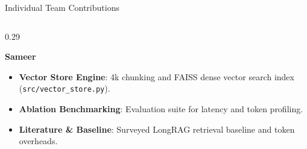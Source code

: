 \documentclass[10pt,aspectratio=169]{beamer}
\begin{document}
\begin{frame}{Individual Team Contributions}
\begin{columns}[onlytextwidth,T]
        \begin{column}{0.29\textwidth}
            \begin{block}{\textbf{Sameer}}
                \scriptsize
                \begin{itemize}\setlength\itemsep{2pt}
                    \item \textbf{Vector Store Engine}: 4k chunking and FAISS dense vector search index (\texttt{src/vector\_store.py}).
                    \item \textbf{Ablation Benchmarking}: Evaluation suite for latency and token profiling.
                    \item \textbf{Literature \& Baseline}: Surveyed LongRAG retrieval baseline and token overheads.
                \end{itemize}
            \end{block}
        \end{column}
    \end{columns}
\end{frame}
\end{document}
